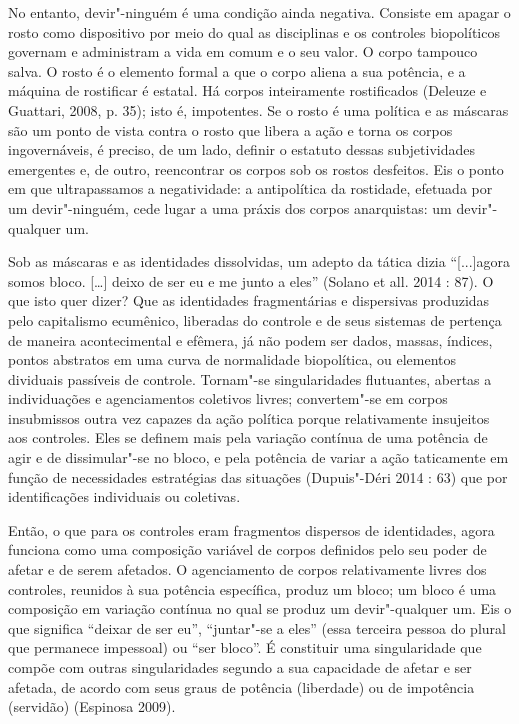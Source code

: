 No entanto, devir"-ninguém é uma condição ainda
negativa. Consiste em apagar o rosto como dispositivo por meio do qual
as disciplinas e os controles biopolíticos governam e administram a vida
em comum e o seu valor. O corpo tampouco salva. O rosto é o elemento
formal a que o corpo aliena a sua potência, e a máquina de rostificar é
estatal. Há corpos inteiramente rostificados (Deleuze e Guattari, 2008,
p. 35); isto é, impotentes. Se o rosto é uma política e as máscaras são
um ponto de vista contra o rosto que libera a ação e torna os corpos
ingovernáveis, é preciso, de um lado, definir o estatuto dessas
subjetividades emergentes e, de outro, reencontrar os corpos sob os
rostos desfeitos. Eis o ponto em que ultrapassamos a negatividade: a
antipolítica da rostidade, efetuada por um devir"-ninguém, cede lugar a
uma práxis dos corpos anarquistas: um devir"-qualquer um.

Sob as máscaras e as identidades dissolvidas, um adepto da tática dizia
``{[}...{]}agora somos bloco. {[}\ldots{}{]} deixo de ser eu e me junto
a eles'' (Solano et all. 2014 : 87). O que isto quer dizer? Que as
identidades fragmentárias e dispersivas produzidas pelo capitalismo
ecumênico, liberadas do controle e de seus sistemas de pertença de
maneira acontecimental e efêmera, já não podem ser dados, massas,
índices, pontos abstratos em uma curva de normalidade biopolítica, ou
elementos dividuais passíveis de controle. Tornam"-se singularidades
flutuantes, abertas a individuações e agenciamentos coletivos livres;
convertem"-se em corpos insubmissos outra vez capazes da ação política
porque relativamente insujeitos aos controles. Eles se definem mais pela
variação contínua de uma potência de agir e de dissimular"-se no bloco, e
pela potência de variar a ação taticamente em função de necessidades
estratégias das situações (Dupuis"-Déri 2014 : 63) que por identificações
individuais ou coletivas.

Então, o que para os controles eram fragmentos dispersos de identidades,
agora funciona como uma composição variável de corpos definidos pelo seu
poder de afetar e de serem afetados. O agenciamento de corpos
relativamente livres dos controles, reunidos à sua potência específica,
produz um bloco; um bloco é uma composição em variação contínua no qual
se produz um devir"-qualquer um. Eis o que significa ``deixar de ser
eu'', ``juntar"-se a eles'' (essa terceira pessoa do plural que permanece
impessoal) ou ``ser bloco''. É constituir uma singularidade que compõe
com outras singularidades segundo a sua capacidade de afetar e ser
afetada, de acordo com seus graus de potência (liberdade) ou de
impotência (servidão) (Espinosa 2009).

